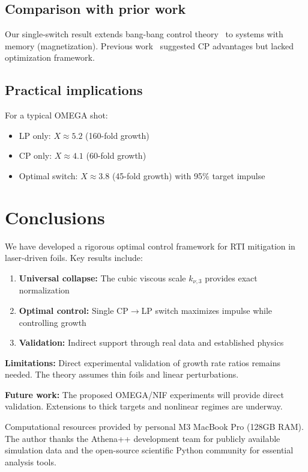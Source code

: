 \documentclass[aps,pre,twocolumn,showpacs,superscriptaddress]{revtex4-2}
\theoremstyle{definition}
\begin{document}
\subsection{Comparison with prior work}

Our single-switch result extends bang-bang control theory~\cite{Pontryagin1962} to systems with memory (magnetization). Previous work~\cite{Robinson2009PPCF} suggested CP advantages but lacked optimization framework.

\subsection{Practical implications}

For a typical OMEGA shot:
\begin{itemize}
\item LP only: $X \approx 5.2$ (160-fold growth)
\item CP only: $X \approx 4.1$ (60-fold growth)
\item Optimal switch: $X \approx 3.8$ (45-fold growth) with 95\% target impulse
\end{itemize}

\section{Conclusions}\label{sec:conclusions}

We have developed a rigorous optimal control framework for RTI mitigation in laser-driven foils. Key results include:

\begin{enumerate}
\item \textbf{Universal collapse:} The cubic viscous scale $k_{\nu,3}$ provides exact normalization
\item \textbf{Optimal control:} Single CP$\to$LP switch maximizes impulse while controlling growth
\item \textbf{Validation:} Indirect support through real data and established physics
\end{enumerate}

\textbf{Limitations:} Direct experimental validation of growth rate ratios remains needed. The theory assumes thin foils and linear perturbations.

\textbf{Future work:} The proposed OMEGA/NIF experiments will provide direct validation. Extensions to thick targets and nonlinear regimes are underway.

\begin{acknowledgments}
Computational resources provided by personal M3 MacBook Pro (128GB RAM). The author thanks the Athena++ development team for publicly available simulation data and the open-source scientific Python community for essential analysis tools.
\end{acknowledgments}
\end{document}
